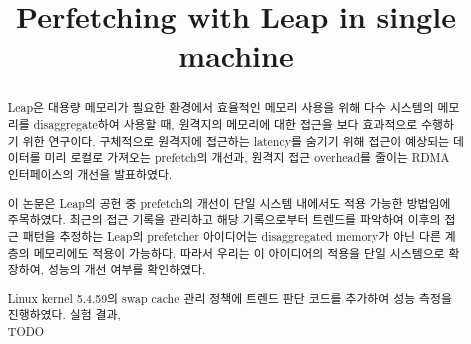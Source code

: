 \documentclass[conference,11pt]{IEEEtran}
\begin{document}
\begin{CJK}{UTF8}{}

    \title{Perfetching with Leap in single machine%
    }

    \author{
    }


    \maketitle

    \begin{abstract}

        Leap은 대용량 메모리가 필요한 환경에서 효율적인 메모리 사용을 위해 다수 시스템의 메모리를 disaggregate하여 사용할 때, 원격지의 메모리에 대한 접근을 보다 효과적으로 수행하기 위한 연구이다. 구체적으로 원격지에 접근하는 latency를 숨기기 위해 접근이 예상되는 데이터를 미리 로컬로 가져오는 prefetch의 개선과, 원격지 접근 overhead를 줄이는 RDMA 인터페이스의 개선을 발표하였다.

        이 논문은 Leap의 공헌 중 prefetch의 개선이 단일 시스템 내에서도 적용 가능한 방법임에 주목하였다. 최근의 접근 기록을 관리하고 해당 기록으로부터 트렌드를 파악하여 이후의 접근 패턴을 추정하는 Leap의 prefetcher 아이디어는 disaggregated memory가 아닌 다른 계층의 메모리에도 적용이 가능하다. 따라서 우리는 이 아이디어의 적용을 단일 시스템으로 확장하여, 성능의 개선 여부를 확인하였다.

        Linux kernel 5.4.59의 swap cache 관리 정책에 트렌드 판단 코드를 추가하여 성능 측정을 진행하였다. 실험 결과, \\
        TODO \\
        \\

    \end{abstract}


\end{CJK}
\end{document}

